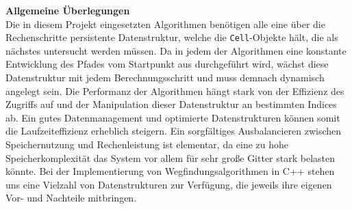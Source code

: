 \textbf{Allgemeine Überlegungen}\\
Die in diesem Projekt eingesetzten Algorithmen benötigen alle eine über die Rechenschritte persistente Datenstruktur,
welche die \texttt{Cell}-Objekte hält, die als nächstes untersucht werden müssen.
Da in jedem der Algorithmen eine konstante Entwicklung des Pfades vom Startpunkt aus durchgeführt wird, wächst diese
Datenstruktur mit jedem Berechnungsschritt und muss demnach dynamisch angelegt sein.
Die Performanz der Algorithmen hängt stark von der Effizienz des Zugriffs auf und der Manipulation dieser Datenstruktur an bestimmten Indices ab.
Ein gutes Datenmanagement und optimierte Datenstrukturen können somit die Laufzeiteffizienz erheblich steigern.
Ein sorgfältiges Ausbalancieren zwischen Speichernutzung und Rechenleistung ist elementar, da eine zu hohe Speicherkomplexität
das System vor allem für sehr große Gitter stark belasten könnte.
Bei der Implementierung von Wegfindungsalgorithmen in C++ stehen uns eine Vielzahl von Datenstrukturen zur Verfügung,
die jeweils ihre eigenen Vor- und Nachteile mitbringen. \cite{iso2020}
